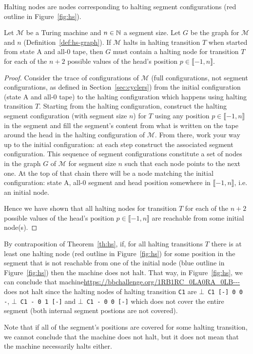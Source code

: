 \begin{definition}[\HS graph]
  Halting nodes are nodes corresponding to halting segment configurations (red outline in Figure~\ref{fig:hs}).

\end{definition}

\begin{theorem}[\HS]\label{th:hs}\normalfont
  Let $\mathcal{M}$ be a Turing machine and $n \in \mathbb{N}$ a segment size. Let $G$ be the \HS graph for $\mathcal{M}$ and $n$ (Definition~\ref{def:hs-graph}). If $\mathcal{M}$ halts in halting transition $T$ when started from state A and all-0 tape, then $G$ must contain a halting node for transition $T$ for each of the $n+2$ possible values of the head's position $p \in \llbracket -1, n \rrbracket$.
\end{theorem}
\begin{proof}
  Consider the trace of configurations of $\mathcal{M}$ (full configurations, not segment configurations, as defined in Section~\ref{sec:cyclers}) from the initial configuration (state A and all-0 tape) to the halting configuration which happens using halting transition $T$. Starting from the halting configuration, construct the halting segment configuration (with segment size $n$) for $T$ using any position $p \in \llbracket -1, n \rrbracket$ in the segment and fill the segment's content from what is written on the tape around the head in the halting configuration of $\mathcal{M}$. From there, work your way up to the initial configuration: at each step construct the associated segment configuration. This sequence of segment configurations constitute a set of nodes in the \HS graph $G$ of $\mathcal{M}$ for segment size $n$ such that each node points to the next one. At the top of that chain there will be a node matching the initial configuration: state A, all-0 segment and head position somewhere in $\llbracket -1, n \rrbracket$, i.e. an initial node.

  Hence we have shown that all halting nodes for transition $T$ for each of the $n+2$ possible values of the head's position $p \in \llbracket -1, n \rrbracket$ are reachable from some initial node(s).
\end{proof}

\begin{remark}\normalfont
  By contraposition of Theorem~\ref{th:hs}, if, for all halting transitions $T$ there is at least one halting node (red outline in Figure~\ref{fig:hs}) for some position in the segment that is not reachable from one of the initial node (blue outline in Figure~\ref{fig:hs}) then the machine does not halt. That way, in Figure~\ref{fig:hs}, we can conclude that machine\url{https://bbchallenge.org/1RB1RC_0LA0RA_0LB---} does not halt since the halting nodes of halting transition \texttt{C1} are \texttt{$\bot$ C1 [-] 0 0 -}, \texttt{$\bot$ C1 - 0 1 [-]} and \texttt{$\bot$ C1 - 0 0 [-]} which does not cover the entire segment (both internal segment postions are not covered).

  Note that if all of the segment's positions are covered for some halting transition, we cannot conclude that the machine does not halt, but it does not mean that the machine necessarily halts either.
\end{remark}


